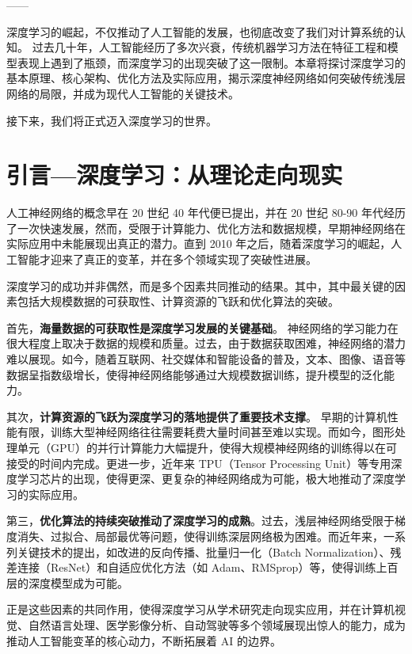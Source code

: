 \begin{flushright}
—— 
\end{flushright}

深度学习的崛起，不仅推动了人工智能的发展，也彻底改变了我们对计算系统的认知。
过去几十年，人工智能经历了多次兴衰，传统机器学习方法在特征工程和模型表现上遇到了瓶颈，而深度学习的出现突破了这一限制。本章将探讨深度学习的基本原理、核心架构、优化方法及实际应用，揭示深度神经网络如何突破传统浅层网络的局限，并成为现代人工智能的关键技术。

接下来，我们将正式迈入深度学习的世界。

\section{引言---深度学习：从理论走向现实}

人工神经网络的概念早在 20 世纪 40 年代便已提出，并在 20 世纪 80-90 年代经历了一次快速发展，然而，受限于计算能力、优化方法和数据规模，早期神经网络在实际应用中未能展现出真正的潜力。直到 2010 年之后，随着深度学习的崛起，人工智能才迎来了真正的变革，并在多个领域实现了突破性进展。

深度学习的成功并非偶然，而是多个因素共同推动的结果。其中，其中最关键的因素包括大规模数据的可获取性、计算资源的飞跃和优化算法的突破。%

首先，{\bf  海量数据的可获取性是深度学习发展的关键基础}。
神经网络的学习能力在很大程度上取决于数据的规模和质量。过去，由于数据获取困难，神经网络的潜力难以展现。如今，随着互联网、社交媒体和智能设备的普及，文本、图像、语音等数据呈指数级增长，使得神经网络能够通过大规模数据训练，提升模型的泛化能力。

其次，{\bf 计算资源的飞跃为深度学习的落地提供了重要技术支撑}。
早期的计算机性能有限，训练大型神经网络往往需要耗费大量时间甚至难以实现。而如今，图形处理单元（GPU）的并行计算能力大幅提升，使得大规模神经网络的训练得以在可接受的时间内完成。更进一步，近年来 TPU（Tensor Processing Unit）等专用深度学习芯片的出现，使得更深、更复杂的神经网络成为可能，极大地推动了深度学习的实际应用。

第三，{\bf 优化算法的持续突破推动了深度学习的成熟}。过去，浅层神经网络受限于梯度消失、过拟合、局部最优等问题，使得训练深层网络极为困难。而近年来，一系列关键技术的提出，如改进的反向传播、批量归一化（Batch Normalization）、残差连接（ResNet）和自适应优化方法（如 Adam、RMSprop）等，使得训练上百层的深度模型成为可能。

正是这些因素的共同作用，使得深度学习从学术研究走向现实应用，并在计算机视觉、自然语言处理、医学影像分析、自动驾驶等多个领域展现出惊人的能力，成为推动人工智能变革的核心动力，不断拓展着 AI 的边界。

